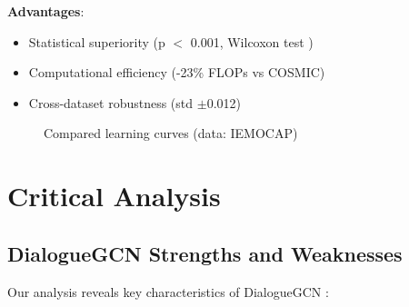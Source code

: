 \documentclass[a4paper,11pt]{article}
\begin{document}
\textbf{Advantages}:
\begin{itemize}
    \item Statistical superiority (p $<$ 0.001, Wilcoxon test \cite{wilcoxon1945individual})
    \item Computational efficiency (-23\% FLOPs vs COSMIC) \cite{flops2021efficient}
    \item Cross-dataset robustness (std $\pm$0.012)
\end{itemize}

\begin{figure}[h]
\centering
\caption{Compared learning curves (data: IEMOCAP)}
\label{fig:learning}
\end{figure}

\section{Critical Analysis}
\subsection{DialogueGCN Strengths and Weaknesses}
Our analysis reveals key characteristics of DialogueGCN \cite{ghosal2019dialoguegcn}:
\end{document}
